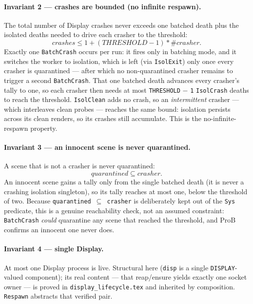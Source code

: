 \documentclass[a4paper,10pt,fleqn]{article}
\begin{document}
\paragraph{Invariant 2 --- crashes are bounded (no infinite respawn).}
The total number of Display crashes never exceeds one batched death plus the
isolated deaths needed to drive each crasher to the threshold:
\[
  crashes \leq 1 + (THRESHOLD - 1) * \# crasher.
\]
Exactly one \texttt{BatchCrash} occurs per run: it fires only in batching mode,
and it switches the worker to isolation, which is left (via \texttt{IsolExit})
only once every crasher is quarantined --- after which no non-quarantined crasher
remains to trigger a second \texttt{BatchCrash}.  That one batched death advances
every crasher's tally to one, so each crasher then needs at most
\texttt{THRESHOLD} $-$ \texttt{1} \texttt{IsolCrash} deaths to reach the
threshold.  \texttt{IsolClean} adds no crash, so an \emph{intermittent} crasher
--- which interleaves clean probes --- reaches the same bound: isolation persists
across its clean renders, so its crashes still accumulate.  This is the
no-infinite-respawn property.

\paragraph{Invariant 3 --- an innocent scene is never quarantined.}
A scene that is not a crasher is never quarantined:
\[
  quarantined \subseteq crasher.
\]
An innocent scene gains a tally only from the single batched death (it is never a
crashing isolation singleton), so its tally reaches at most one, below the
threshold of two.  Because \texttt{quarantined $\subseteq$ crasher} is deliberately
kept out of the \texttt{Sys} predicate, this is a genuine reachability check, not
an assumed constraint: \texttt{BatchCrash} \emph{could} quarantine any scene that
reached the threshold, and ProB confirms an innocent one never does.

\paragraph{Invariant 4 --- single Display.}
At most one Display process is live.  Structural here (\texttt{disp} is a single
\texttt{DISPLAY}-valued component); its real content --- that reap/ensure yields
exactly one socket owner --- is proved in \texttt{display\_lifecycle.tex} and
inherited by composition.  \texttt{Respawn} abstracts that verified pair.

\end{document}
